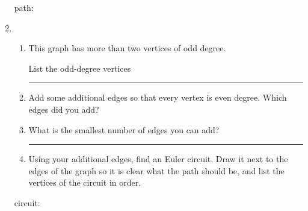 \documentclass[12pt]{article}
\newcommand{\ans}[1][1in]{\rule{#1}{.5pt}}
\newcommand{\be}{\begin{enumerate}}
\newcommand{\ee}{\end{enumerate}}
\begin{document}
\begin{enumerate}
\begin{tikzpicture}[baseline=(current bounding box.center), scale=.8]
\end{tikzpicture}

\bigskip

path: \hrulefill

\item 
\be
\item This graph has more than two vertices of odd degree. 

List the odd-degree vertices \ans
\item Add some additional edges so that every vertex is even degree. Which edges did you add?

\hrulefill

\item  What is the smallest number of edges you can add?

\ans

\item Using your additional edges, find an Euler circuit. Draw it next to the edges of the graph so it is clear what the path should be, and list the vertices of the circuit in order.
\ee

\bigskip


\bigskip

circuit: \hrulefill

\end{enumerate}
\end{document}
